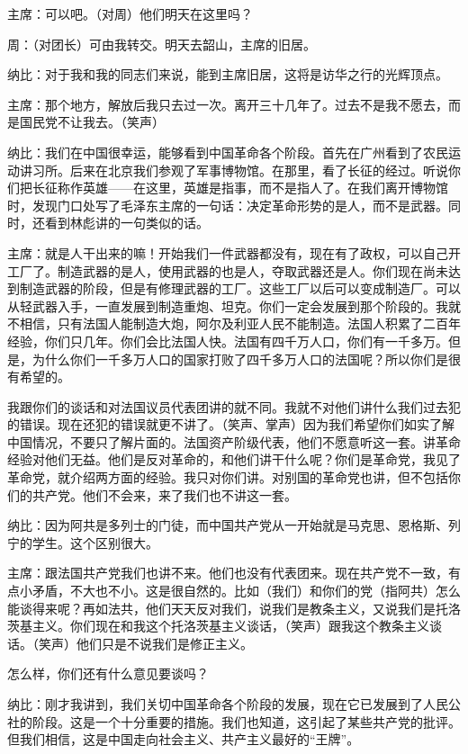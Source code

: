主席：可以吧。（对周）他们明天在这里吗？

周：（对团长）可由我转交。明天去韶山，主席的旧居。

纳比：对于我和我的同志们来说，能到主席旧居，这将是访华之行的光辉顶点。

主席：那个地方，解放后我只去过一次。离开三十几年了。过去不是我不愿去，而是国民党不让我去。（笑声）

纳比：我们在中国很幸运，能够看到中国革命各个阶段。首先在广州看到了农民运动讲习所。后来在北京我们参观了军事博物馆。在那里，看了长征的经过。听说你们把长征称作英雄——在这里，英雄是指事，而不是指人了。在我们离开博物馆时，发现门口处写了毛泽东主席的一句话：决定革命形势的是人，而不是武器。同时，还看到林彪讲的一句类似的话。

主席：就是人干出来的嘛！开始我们一件武器都没有，现在有了政权，可以自己开工厂了。制造武器的是人，使用武器的也是人，夺取武器还是人。你们现在尚未达到制造武器的阶段，但是有修理武器的工厂。这些工厂以后可以变成制造厂。可以从轻武器入手，一直发展到制造重炮、坦克。你们一定会发展到那个阶段的。我就不相信，只有法国人能制造大炮，阿尔及利亚人民不能制造。法国人积累了二百年经验，你们只几年。你们会比法国人快。法国有四千万人口，你们有一千多万。但是，为什么你们一千多万人口的国家打败了四千多万人口的法国呢？所以你们是很有希望的。

我跟你们的谈话和对法国议员代表团讲的就不同。我就不对他们讲什么我们过去犯的错误。现在还犯的错误就更不讲了。（笑声、掌声）因为我们希望你们如实了解中国情况，不要只了解片面的。法国资产阶级代表，他们不愿意听这一套。讲革命经验对他们无益。他们是反对革命的，和他们讲干什么呢？你们是革命党，我见了革命党，就介绍两方面的经验。我只对你们讲。对别国的革命党也讲，但不包括你们的共产党。他们不会来，来了我们也不讲这一套。

纳比：因为阿共是多列士的门徒，而中国共产党从一开始就是马克思、恩格斯、列宁的学生。这个区别很大。

主席：跟法国共产党我们也讲不来。他们也没有代表团来。现在共产党不一致，有点小矛盾，不大也不小。这是很自然的。比如（我们）和你们的党（指阿共）怎么能谈得来呢？再如法共，他们天天反对我们，说我们是教条主义，又说我们是托洛茨基主义。你们现在和我这个托洛茨基主义谈话，（笑声）跟我这个教条主义谈话。（笑声）他们只是不说我们是修正主义。

怎么样，你们还有什么意见要谈吗？

纳比：刚才我讲到，我们关切中国革命各个阶段的发展，现在它已发展到了人民公社的阶段。这是一个十分重要的措施。我们也知道，这引起了某些共产党的批评。但我们相信，这是中国走向社会主义、共产主义最好的“王牌”。

